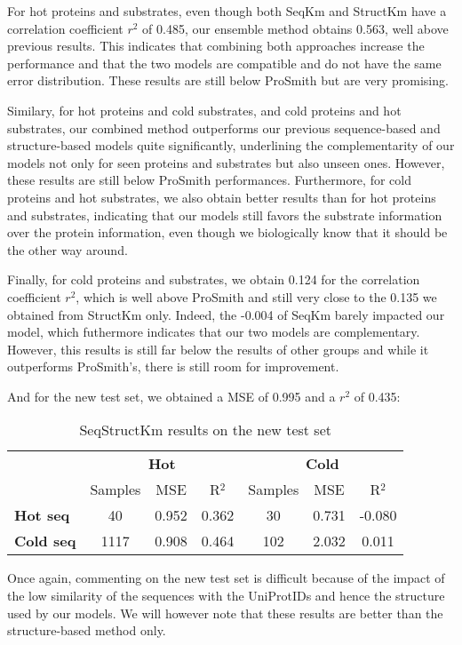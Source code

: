 For hot proteins and substrates, even though both SeqKm and StructKm have a correlation coefficient $r^2$ of 0.485, our ensemble method obtains 0.563, well above previous results. This indicates that combining both approaches increase the performance and that the two models are compatible and do not have the same error distribution. These results are still below ProSmith but are very promising.

Similary, for hot proteins and cold substrates, and cold proteins and hot substrates, our combined method outperforms our previous sequence-based and structure-based models quite significantly, underlining the complementarity of our models not only for seen proteins and substrates but also unseen ones. However, these results are still below ProSmith performances. Furthermore, for cold proteins and hot substrates, we also obtain better results than for hot proteins and substrates, indicating that our models still favors the substrate information over the protein information, even though we biologically know that it should be the other way around. 

Finally, for cold proteins and substrates, we obtain 0.124 for the correlation coefficient $r^2$, which is well above ProSmith and still very close to the 0.135 we obtained from StructKm only. Indeed, the -0.004 of SeqKm barely impacted our model, which futhermore indicates that our two models are complementary. However, this results is still far below the results of other groups and while it outperforms ProSmith's, there is still room for improvement.

And for the new test set, we obtained a MSE of 0.995 and a $r^2$ of 0.435:

\begin{table}[ht]
  \centering
  \begin{tabular}{lcccccc}
  \hline
   & \multicolumn{3}{c}{\textbf{Hot}} & \multicolumn{3}{c}{\textbf{Cold}} \\
   & Samples & MSE & R\(^2\) & Samples & MSE & R\(^2\) \\ \hline
  \textbf{Hot seq}  & 40 & 0.952 & 0.362 & 30 & 0.731 & -0.080 \\
  \textbf{Cold seq} & 1117 & 0.908 & 0.464 & 102 & 2.032 & 0.011 \\ \hline
  \end{tabular}
  \caption{SeqStructKm results on the new test set}
  \label{tab:summary_performance}
\end{table}

Once again, commenting on the new test set is difficult because of the impact of the low similarity of the sequences with the UniProtIDs and hence the structure used by our models. We will however note that these results are better than the structure-based method only. 


